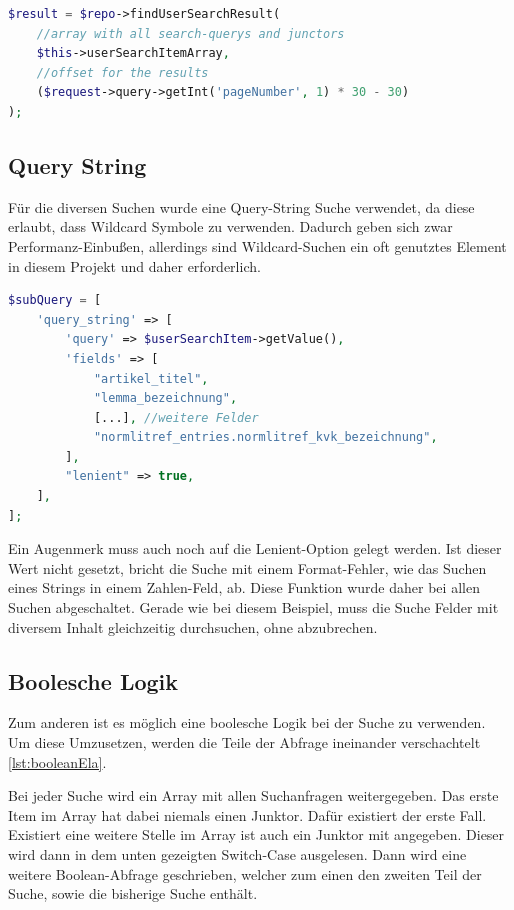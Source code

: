 \begin{lstlisting}[language=PHP, frame=single, label={lst:generierung}] 
$result = $repo->findUserSearchResult(
    //array with all search-querys and junctors
    $this->userSearchItemArray, 
    //offset for the results
    ($request->query->getInt('pageNumber', 1) * 30 - 30)
);
\end{lstlisting}

\subsection{Query String}
Für die diversen Suchen wurde eine Query-String Suche verwendet, da diese erlaubt, dass Wildcard Symbole zu verwenden. Dadurch geben sich zwar Performanz-Einbußen, allerdings sind Wildcard-Suchen ein oft genutztes Element in diesem Projekt und daher erforderlich.

\begin{lstlisting}[language=PHP, frame=single, label={lst:aufbauQueryString}] 
$subQuery = [
    'query_string' => [
        'query' => $userSearchItem->getValue(),
        'fields' => [
            "artikel_titel",
            "lemma_bezeichnung",
            [...], //weitere Felder
            "normlitref_entries.normlitref_kvk_bezeichnung",
        ],
        "lenient" => true,
    ],
];
\end{lstlisting}

Ein Augenmerk muss auch noch auf die Lenient-Option gelegt werden. Ist dieser Wert nicht gesetzt, bricht die Suche mit einem Format-Fehler, wie das Suchen eines Strings in einem Zahlen-Feld, ab. Diese Funktion wurde daher bei allen Suchen abgeschaltet. Gerade wie bei diesem Beispiel, muss die Suche Felder mit diversem Inhalt gleichzeitig durchsuchen, ohne abzubrechen. 

\subsection{Boolesche Logik}

Zum anderen ist es möglich eine boolesche Logik bei der Suche zu verwenden. Um diese Umzusetzen, werden die Teile der Abfrage ineinander verschachtelt \ref{lst:booleanEla}. 

Bei jeder Suche wird ein Array mit allen Suchanfragen weitergegeben. Das erste Item im Array hat dabei niemals einen Junktor. Dafür existiert der erste Fall. Existiert eine weitere Stelle im Array ist auch ein Junktor mit angegeben. Dieser wird dann in dem unten gezeigten Switch-Case ausgelesen. Dann wird eine weitere Boolean-Abfrage geschrieben, welcher zum einen den zweiten Teil der Suche, sowie die bisherige Suche enthält.

